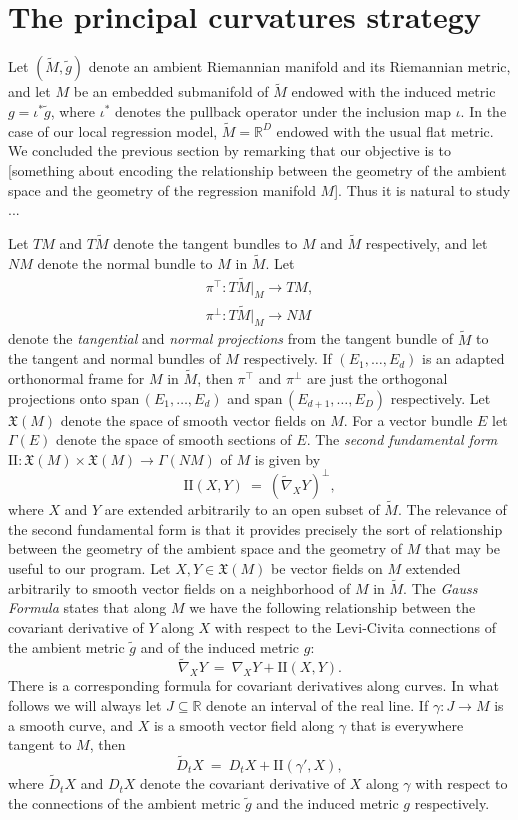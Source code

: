\documentclass[11pt]{article}
\newcommand{\benn}{\begin{equation*}}
\newcommand{\eenn}{\end{equation*}}
\newcommand{\R}{\ensuremath{\mathbb{R}}}
\newcommand{\spn}{\mathrm{span} \,}
\numberwithin{equation}{section}
\begin{document}
\section{The principal curvatures strategy}


Let $(\tilde{M}, \tilde{g})$ denote an ambient Riemannian manifold and its Riemannian metric, and let $M$ be an embedded submanifold of $\tilde{M}$ endowed with the induced metric $g = \iota^{*} \tilde{g}$, where $\iota^*$ denotes the pullback operator under the inclusion map $\iota$. In the case of our local regression model, $\tilde{M} = \R^D$ endowed with the usual flat metric. We concluded the previous section by remarking that our objective is to [something about encoding the relationship between the geometry of the ambient space and the geometry of the regression manifold $M$]. Thus it is natural to study ...

Let $TM$ and $T\tilde{M}$ denote the tangent bundles to $M$ and $\tilde{M}$ respectively, and let $NM$ denote the normal bundle to $M$ in $\tilde{M}$. Let
\begin{align*}
	\pi^{\top}: T\tilde{M}|_M \to TM, \\
	\pi^{\perp}: T\tilde{M}|_M \to NM
\end{align*}
denote the \emph{tangential} and \emph{normal projections} from the tangent bundle of $\tilde{M}$ to the tangent and normal bundles of $M$ respectively. If $(E_1, \ldots, E_d)$ is an adapted orthonormal frame for $M$ in $\tilde{M}$, then $\pi^{\top}$ and $\pi^{\perp}$ are just the orthogonal projections onto $\spn(E_1, \ldots, E_d)$ and $\spn(E_{d+1}, \ldots, E_D)$ respectively. Let $\mathfrak{X}(M)$ denote the space of smooth vector fields on $M$. For a vector bundle $E$ let $\Gamma(E)$ denote the space of smooth sections of $E$. The \emph{second fundamental form} $\mathrm{II}: \mathfrak{X}(M) \times \mathfrak{X}(M) \to \Gamma(NM)$ of $M$ is given by
\benn
	\mathrm{II}(X, Y) \ = \ (\tilde{\nabla}_X Y)^{\perp},
\eenn
where $X$ and $Y$ are extended arbitrarily to an open subset of $\tilde{M}$. The relevance of the second fundamental form is that it provides precisely the sort of relationship between the geometry of the ambient space and the geometry of $M$ that may be useful to our program. Let $X, Y \in \mathfrak{X}(M)$ be vector fields on $M$ extended arbitrarily to smooth vector fields on a neighborhood of $M$ in $\tilde{M}$. The \emph{Gauss Formula} states that along $M$ we have the following relationship between the covariant derivative of $Y$ along $X$ with respect to the Levi-Civita connections of the ambient metric $\tilde{g}$ and of the induced metric $g$:
\benn
	\tilde{\nabla}_X Y \ = \ \nabla_X Y + \mathrm{II}(X, Y).
\eenn
There is a corresponding formula for covariant derivatives along curves. In what follows we will always let $J \subseteq \R$ denote an interval of the real line. If $\gamma: J \to M$ is a smooth curve, and $X$ is a smooth vector field along $\gamma$ that is everywhere tangent to $M$, then
\benn
	\tilde{D}_tX \ = \ D_tX + \mathrm{II}(\gamma', X),
\eenn
where $\tilde{D}_t X$ and $D_t X$ denote the covariant derivative of $X$ along $\gamma$ with respect to the connections of the ambient metric $\tilde{g}$ and the induced metric $g$ respectively.
\end{document}
